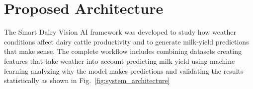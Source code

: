 \documentclass[conference]{IEEEtran}
\begin{document}
	
	\section{Proposed Architecture}
	The Smart Dairy Vision AI framework was developed to study how weather conditions affect dairy cattle productivity and to generate milk-yield predictions that make sense. The complete workflow includes combining datasets creating features that take weather into account predicting milk yield using machine learning analyzing why the model makes predictions and validating the results statistically as shown in Fig.~\ref{fig:system_architecture}
	
	
\end{document}
